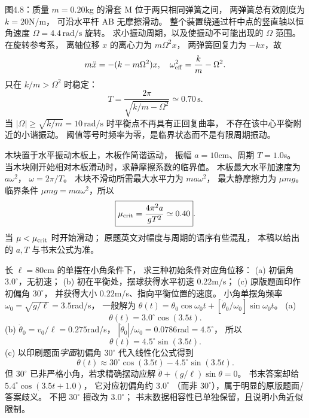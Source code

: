 图4.8：质量 $m=0.20$kg 的滑套 M 位于两只相同弹簧之间，
两弹簧总有效刚度为 $k=20$N/m，
可沿水平杆 AB 无摩擦滑动。
整个装置绕通过杆中点的竖直轴以恒角速度
$\Omega=4.4\,\mathrm{rad/s}$ 旋转。
求小振动周期，以及使振动不可能出现的 $\Omega$ 范围。
\exsolution
在旋转参考系，
离轴位移 $x$ 的离心力为 $m\Omega^2x$，
两弹簧回复力为 $-kx$，故
\[
m\ddot x=-(k-m\Omega^2)x,
\quad
\omega_{\rm eff}^2=\frac km-\Omega^2.
\]
只在 $k/m>\Omega^2$ 时稳定：
\[
\boxed{T=\frac{2\pi}{\sqrt{k/m-\Omega^2}}
\simeq0.70\,\mathrm s}.
\]
当
$\boxed{|\Omega|\ge\sqrt{k/m}=10\,\mathrm{rad/s}}$
时平衡点不再具有正回复曲率，
不存在该中心平衡附近的小谐振动。
\excheck 阈值等号时频率为零，是临界状态而不是有限周期振动。

木块置于水平振动木板上，木板作简谐运动，
振幅 $a=10$cm、周期 $T=1.0$s。
当木块刚开始相对木板滑动时，求静摩擦系数的临界值。
\exsolution
木板最大水平加速度为
$a\omega^2$，
$\omega=2\pi/T$。
木块不滑动所需最大水平力为
$ma\omega^2$，
最大静摩擦力为 $\mu mg$。
临界条件
$\mu mg=ma\omega^2$，所以
\[
\boxed{\mu_{\rm crit}=\frac{4\pi^2a}{gT^2}
\simeq0.40}.
\]
\excheck 当 $\mu<\mu_{\rm crit}$ 时开始滑动；
原题英文对幅度与周期的语序有些混乱，
本稿以给出的 $a,T$ 与书末公式为准。

长 $\ell=80$cm 的单摆在小角条件下，
求三种初始条件对应角位移：
(a) 初偏角 $3.0^\circ$，无初速；
(b) 初在平衡处，摆球获得水平初速 $0.22$m/s；
(c) 原版题面印作初偏角 $30^\circ$，
并获得大小 $0.22$m/s、指向平衡位置的速度。
\exsolution
小角单摆角频率
$\omega_0=\sqrt{g/\ell}=3.5$rad/s，
一般解为
$\theta(t)=\theta_0\cos\omega_0t+
[\dot\theta_0/\omega_0]\sin\omega_0t$。
(a)
\[
\boxed{\theta(t)=3.0^\circ\cos(3.5t)}.
\]
(b) $\dot\theta_0=v_0/\ell=0.275$rad/s，
$|\dot\theta_0|/\omega_0=0.0786$rad$=4.5^\circ$，
所以
\[
\boxed{\theta(t)=4.5^\circ\sin(3.5t)}.
\]
(c) 以印刷题面\emph{字面}初偏角
$30^\circ$ 代入线性化公式得到
\[
\boxed{\theta(t)\approx30^\circ\cos(3.5t)
-4.5^\circ\sin(3.5t)}.
\]
但 $30^\circ$ 已非严格小角，若求精确摆动应解
$\ddot\theta+(g/\ell)\sin\theta=0$。
书末答案却给
$5.4^\circ\cos(3.5t+1.0)$，
它对应初偏角约 $3.0^\circ$
（而非 $30^\circ$），属于明显的原版题面/答案歧义。
\excheck 不把 $30^\circ$ 擅改为 $3.0^\circ$；
书末数据相容性已单独保留，且说明小角近似限制。
